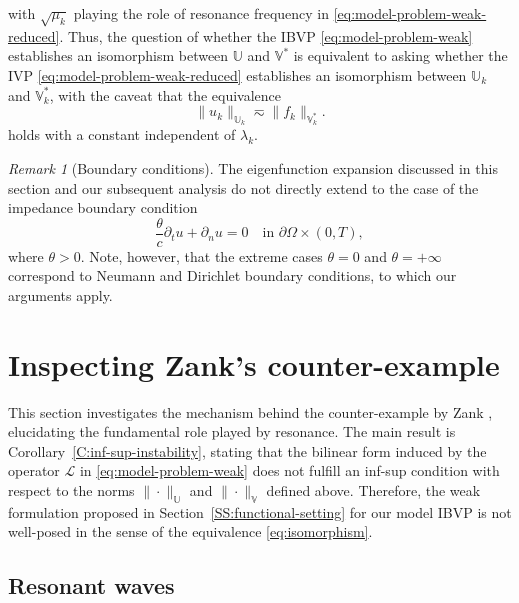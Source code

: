 \documentclass{amsart}
\theoremstyle{plain}
\theoremstyle{remark}
\newtheorem{remark}[theorem]{Remark}
\numberwithin{equation}{section}
\numberwithin{theorem}{section}
\newcommand{\trial}{\mathbb{U}}
\newcommand{\test}{\mathbb{V}}
\newcommand{\data}{\mathbb{V}^*}
\begin{document}
with $\sqrt{\mu_k}$ playing the role of resonance frequency in  \eqref{eq:model-problem-weak-reduced}. Thus, the question of whether the IBVP \eqref{eq:model-problem-weak} establishes an isomorphism between $\trial$ and $\data$ is equivalent to asking whether the IVP \eqref{eq:model-problem-weak-reduced} establishes an isomorphism between $\trial_k$ and $\data_k$, with the caveat that the equivalence
\begin{equation}
\label{eq:isomorphism-k-mode}
  \| u_k \|_{\trial_k} \eqsim \|f_k\|_{\data_k}.
\end{equation}
holds with a constant independent of  $\lambda_k$.

\begin{remark}[Boundary conditions]
\label{rem:BoundaryConditions}
The eigenfunction expansion discussed in this section and our subsequent analysis do not directly extend to the case of the impedance boundary condition
\begin{equation*}
\frac{\theta}{c} \partial_t u + \partial_n u  = 0 \quad \text{in $\partial \Omega \times (0,T)$},
\end{equation*}
where $\theta > 0$. Note, however, that the extreme cases $\theta = 0$ and $\theta = +\infty$ correspond to Neumann and Dirichlet boundary conditions, to which our arguments apply.
\end{remark}



\section{Inspecting Zank's counter-example}
\label{S:Zank-counter-example}
This section investigates the mechanism behind the counter-example by Zank \cite[Theorem 4.2.23]{Zank:20}, elucidating the fundamental role played by resonance. The main result is Corollary~\ref{C:inf-sup-instability}, stating that the bilinear form induced by the operator $\mathcal{L}$ in \eqref{eq:model-problem-weak} does not fulfill  an inf-sup condition with respect to the norms $\|\cdot\|_\trial $ and $ \|\cdot\|_\test$ defined above. Therefore, the weak formulation proposed in Section~\ref{SS:functional-setting} for our model IBVP is not well-posed in the sense of the equivalence \eqref{eq:isomorphism}.


\subsection{Resonant waves}
\label{SS:resonant-waves} 
\end{document}
